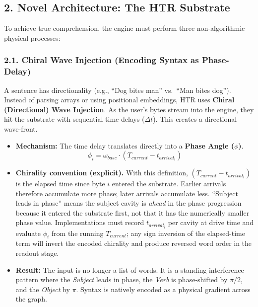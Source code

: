 \documentclass[
  11pt,
  a4paper,
]{article}
\providecommand{\tightlist}{%
  \setlength{\itemsep}{0pt}\setlength{\parskip}{0pt}}
\begin{document}
\subsection{2. Novel Architecture: The HTR
Substrate}\label{novel-architecture-the-htr-substrate}

To achieve true comprehension, the engine must perform three
non-algorithmic physical processes:

\subsubsection{2.1. Chiral Wave Injection (Encoding Syntax as
Phase-Delay)}\label{chiral-wave-injection-encoding-syntax-as-phase-delay}

A sentence has directionality (e.g., ``Dog bites man'' vs.~``Man bites
dog''). Instead of parsing arrays or using positional embeddings, HTR
uses \textbf{Chiral (Directional) Wave Injection}. As the user's bytes
stream into the engine, they hit the substrate with sequential time
delays (\(\Delta t\)). This creates a directional wave-front.

\begin{itemize}
\tightlist
\item
  \textbf{Mechanism:} The time delay translates directly into a
  \textbf{Phase Angle (\(\phi\))}.
  \[ \phi_i = \omega_{base} \cdot (T_{current} - t_{arrival_i}) \]
\item
  \textbf{Chirality convention (explicit).} With this definition,
  \((T_{current} - t_{arrival_i})\) is the elapsed time since byte \(i\)
  entered the substrate. Earlier arrivals therefore accumulate more
  phase; later arrivals accumulate less. ``Subject leads in phase''
  means the subject cavity is \emph{ahead} in the phase progression
  because it entered the substrate first, not that it has the
  numerically smaller phase value. Implementations must record
  \(t_{arrival_i}\) per cavity at drive time and evaluate \(\phi_i\)
  from the running \(T_{current}\); any sign inversion of the
  elapsed-time term will invert the encoded chirality and produce
  reversed word order in the readout stage.
\item
  \textbf{Result:} The input is no longer a list of words. It is a
  standing interference pattern where the \emph{Subject} leads in phase,
  the \emph{Verb} is phase-shifted by \(\pi/2\), and the \emph{Object}
  by \(\pi\). Syntax is natively encoded as a physical gradient across
  the graph.
\end{itemize}
\end{document}
